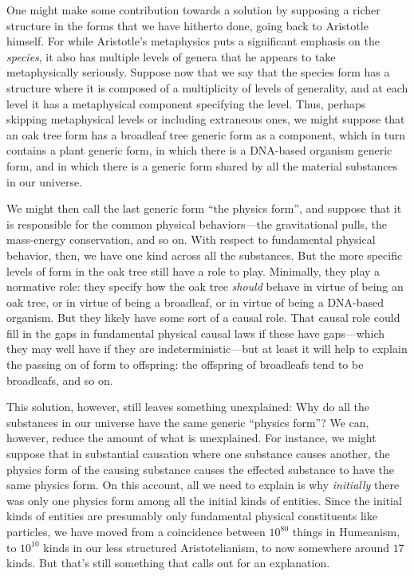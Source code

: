 One might make some contribution towards a solution by supposing a richer structure in the forms that we have hitherto
done, going back to Aristotle himself. For while Aristotle's metaphysics puts a significant emphasis on the \textit{species},
it also has multiple levels of genera that he appears to take metaphysically seriously. Suppose now that we say that 
the species form has a structure where it is composed of a multiplicity of levels of generality, and at each level 
it has a metaphysical component specifying the level. Thus, perhaps skipping metaphysical levels or including extraneous 
ones, we might suppose that an oak tree form has a broadleaf tree generic form as a component, which in turn contains 
a plant generic form, in which there is a DNA-based organism generic form, and in which there is a generic form shared 
by all the material substances in our universe. 

We might then call the last generic form ``the physics form'', and suppose that it is responsible for the common 
physical behaviors---the gravitational pulls, the mass-energy conservation, and so on. With respect to fundamental
physical behavior, then, we have one kind across all the substances. But the more specific levels of form in the 
oak tree still have a role to play. Minimally, they play a normative role: they specify how the oak tree \textit{should}
behave in virtue of being an oak tree, or in virtue of being a broadleaf, or in virtue of being a DNA-based organism.
But they likely have some sort of a causal role. That causal role could fill in the gaps in fundamental physical causal laws
if these have gaps---which they may well have if they are indeterministic---but at least it will help to explain the 
passing on of form to offspring: the offspring of broadleafs tend to be broadleafs, and so on. 

This solution, however, still leaves something unexplained: Why do all the substances in our universe have the 
same generic ``physics form''? We can, however, reduce the amount of what is unexplained. For instance, we might 
suppose that in substantial causation where one substance causes another, the physics form of the causing substance
causes the effected substance to have the same physics form. On this account, all we need to explain is why 
\textit{initially} there was only one physics form among all the initial kinds of entities. Since the initial 
kinds of entities are presumably only fundamental physical constituents like particles, we have moved from a 
coincidence between $10^{80}$ things in Humeanism, to $10^{10}$ kinds in our less structured Aristotelianism,
to now somewhere around $17$ kinds. But that's still something that calls out for an explanation.


